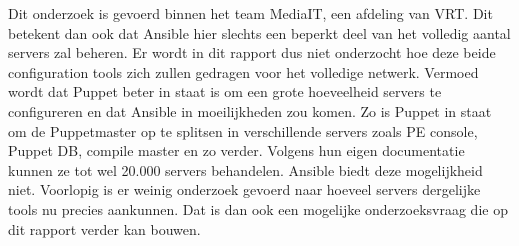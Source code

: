 Dit onderzoek is gevoerd binnen het team MediaIT, een afdeling van \gls{VRT}. Dit betekent dan ook dat Ansible hier slechts een beperkt deel van het volledig aantal servers zal beheren. Er wordt in dit rapport dus niet onderzocht hoe deze beide configuration tools zich zullen gedragen voor het volledige netwerk. Vermoed wordt dat Puppet beter in staat is om een grote hoeveelheid servers te configureren en dat Ansible in moeilijkheden zou komen. Zo is Puppet in staat om de Puppetmaster op te splitsen in verschillende servers zoals PE console, Puppet DB, compile master en zo verder. Volgens hun eigen documentatie kunnen ze tot wel 20.000 servers behandelen. Ansible biedt deze mogelijkheid niet. Voorlopig is er weinig onderzoek gevoerd naar hoeveel servers dergelijke tools nu precies aankunnen. Dat is dan ook een mogelijke onderzoeksvraag die op dit rapport verder kan bouwen.